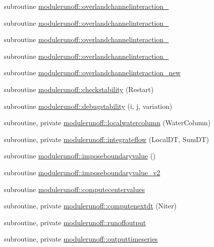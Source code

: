 \begin{DoxyCompactItemize}
\item 
subroutine \mbox{\hyperlink{namespacemodulerunoff_a83d1f0b3f63668b07444f05e9e5bcf7c}{modulerunoff\+::overlandchannelinteraction\+\_}}
\item 
subroutine \mbox{\hyperlink{namespacemodulerunoff_af059c1ee46f4d88ba5904020c0d1edfd}{modulerunoff\+::overlandchannelinteraction\+\_}}
\item 
subroutine \mbox{\hyperlink{namespacemodulerunoff_add510de98548d322d9084c2782b07388}{modulerunoff\+::overlandchannelinteraction\+\_}}
\item 
subroutine \mbox{\hyperlink{namespacemodulerunoff_a5389b89d2ccfe710976c31b556113eca}{modulerunoff\+::overlandchannelinteraction\+\_}}
\item 
subroutine \mbox{\hyperlink{namespacemodulerunoff_a03f16d8e0cac2434944d8e8ac46db4c2}{modulerunoff\+::overlandchannelinteraction\+\_\+new}}
\item 
subroutine \mbox{\hyperlink{namespacemodulerunoff_a330dcdf852e8d32ad8f61027fca5572d}{modulerunoff\+::checkstability}} (Restart)
\item 
subroutine \mbox{\hyperlink{namespacemodulerunoff_ad470166654c51ff37fe83cafeef5a424}{modulerunoff\+::debugstability}} (i, j, variation)
\item 
subroutine, private \mbox{\hyperlink{namespacemodulerunoff_abd7df3c244fbd0c4171c796df0f50906}{modulerunoff\+::localwatercolumn}} (Water\+Column)
\item 
subroutine, private \mbox{\hyperlink{namespacemodulerunoff_ad94c220c4dbba10ee5046785e9e782e9}{modulerunoff\+::integrateflow}} (Local\+DT, Sum\+DT)
\item 
subroutine \mbox{\hyperlink{namespacemodulerunoff_a994fa95e6648fa412fa3e0982c2953e3}{modulerunoff\+::imposeboundaryvalue}} ()
\item 
subroutine \mbox{\hyperlink{namespacemodulerunoff_acf9771f898b15e849b1eaba077dd0d83}{modulerunoff\+::imposeboundaryvalue\+\_\+v2}}
\item 
subroutine \mbox{\hyperlink{namespacemodulerunoff_a922ce27a6758e75221357b9572099e5a}{modulerunoff\+::computecentervalues}}
\item 
subroutine, private \mbox{\hyperlink{namespacemodulerunoff_a7e93c436177a4089e806a4f1fdeedc77}{modulerunoff\+::computenextdt}} (Niter)
\item 
subroutine, private \mbox{\hyperlink{namespacemodulerunoff_af0c6bd2433c33b62204214405fa2bd23}{modulerunoff\+::runoffoutput}}
\item 
subroutine, private \mbox{\hyperlink{namespacemodulerunoff_aaf5ac22ae6531f74c06c4596a878eaf9}{modulerunoff\+::outputtimeseries}}

\end{DoxyCompactItemize}

